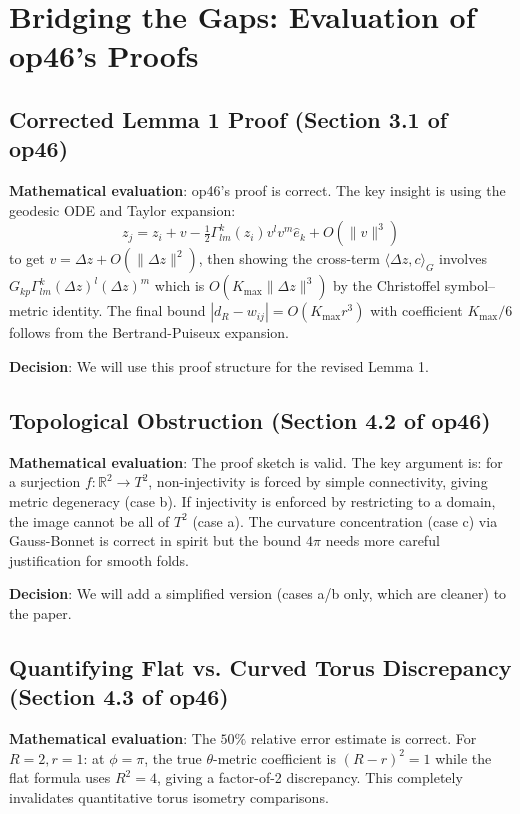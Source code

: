 \documentclass{article}
\begin{document}
\section{Bridging the Gaps: Evaluation of op46's Proofs}

\subsection{Corrected Lemma 1 Proof (Section 3.1 of op46)}

\textbf{Mathematical evaluation}: op46's proof is correct. The key insight is
using the geodesic ODE and Taylor expansion:
\[
  z_j = z_i + v - \tfrac{1}{2}\Gamma^k_{lm}(z_i)v^l v^m \hat{e}_k + O(\|v\|^3)
\]
to get $v = \Delta z + O(\|\Delta z\|^2)$, then showing the cross-term
$\langle \Delta z, c \rangle_{G}$ involves $G_{kp}\Gamma^k_{lm}(\Delta z)^l(\Delta z)^m$
which is $O(K_{\max}\|\Delta z\|^3)$ by the Christoffel symbol--metric identity.
The final bound $|d_R - w_{ij}| = O(K_{\max} r^3)$ with coefficient $K_{\max}/6$
follows from the Bertrand-Puiseux expansion.

\textbf{Decision}: We will use this proof structure for the revised Lemma 1.

\subsection{Topological Obstruction (Section 4.2 of op46)}

\textbf{Mathematical evaluation}: The proof sketch is valid. The key argument
is: for a surjection $f: \mathbb{R}^2 \to T^2$, non-injectivity is forced by
simple connectivity, giving metric degeneracy (case b). If injectivity is
enforced by restricting to a domain, the image cannot be all of $T^2$ (case a).
The curvature concentration (case c) via Gauss-Bonnet is correct in spirit but
the bound $4\pi$ needs more careful justification for smooth folds.

\textbf{Decision}: We will add a simplified version (cases a/b only, which are
cleaner) to the paper.

\subsection{Quantifying Flat vs. Curved Torus Discrepancy (Section 4.3 of op46)}

\textbf{Mathematical evaluation}: The $50\%$ relative error estimate is correct.
For $R=2, r=1$: at $\phi=\pi$, the true $\theta$-metric coefficient is
$(R-r)^2 = 1$ while the flat formula uses $R^2 = 4$, giving a factor-of-2
discrepancy. This completely invalidates quantitative torus isometry comparisons.
\end{document}
